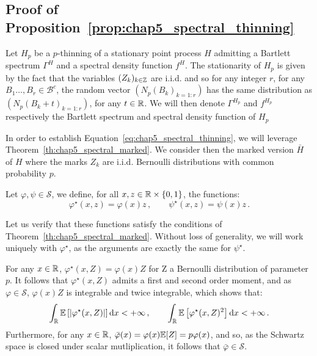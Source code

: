 \begin{subappendices}
    \section{Proof of Proposition~\ref{prop:chap5_spectral_thinning}}\label{appendix:chap5_proof_spectral_thinning}
        Let $H_p$ be a $p$-thinning of a stationary point process $H$ admitting a Bartlett spectrum $\Gamma^H$ and a spectral density function $f^H$.
        The stationarity of $H_p$ is given by the fact that the variables $(Z_k)_{k\in{\mathbb Z}}$ are i.i.d. and so for any integer $r$, 
        for any $B_1\ldots, B_r \in\mathcal{B}^c$, 
        the random vector $(N_p(B_k)_{k=1:r})$ has the same distribution as $(N_p(B_k+t)_{k=1:r})$,
        for any $t\in{\mathbb R}$.
        We will then denote $\Gamma^{H_p}$ and $f^{H_p}$ respectively the Bartlett spectrum and spectral density function of $H_p$

        In order to establish Equation~\eqref{eq:chap5_spectral_thinning}, we will leverage Theorem~\ref{th:chap5_spectral_marked}.
        We consider then the marked version $\bar H$ of $H$ where the marks $Z_k$ are i.i.d. Bernoulli distributions with common probability $p$.

        Let $\varphi, \psi \in \mathcal{S}$, we define, for all $x,z\in{\mathbb R}\times\{0,1\}$, the functions:
        \[\varphi^\star(x,z) = \varphi(x)z\,,\qquad \psi^\star(x,z) = \psi(x)z\,.\]

        Let us verify that these functions satisfy the conditions of Theorem~\ref{th:chap5_spectral_marked}. 
        Without loss of generality, we will work uniquely with $\varphi^\star$, as the arguments are exactly the same for $\psi^\star$.
        
        For any $x\in{\mathbb R}$, $\varphi^\star(x, Z) = \varphi(x)Z$ for Z a Bernoulli distribution of parameter $p$.
        It follows that $\varphi^\star(x, Z)$ admits a first and second order moment, and as $\varphi\in\mathcal{S}$, 
        $\varphi(x)Z$ is integrable and twice integrable, which shows that:
                \[
                \int_{{\mathbb R}}{{\mathbb E}\left[|\varphi^\star(x, Z)|\right]{\mathrm{d}} x} < +\infty\,,\qquad 
                \int_{{\mathbb R}}{{\mathbb E}\left[\varphi^\star(x, Z)^2\right]{\mathrm{d}} x} < +\infty\,.
                \]
        Furthermore, for any $x\in{\mathbb R}$, $\bar \varphi(x) = \varphi(x){\mathbb E}[Z] = p \varphi(x)$,
        and so, as the Schwartz space is closed under scalar mutliplication, it follows that $\bar \varphi\in\mathcal{S}$.


\end{subappendices}
